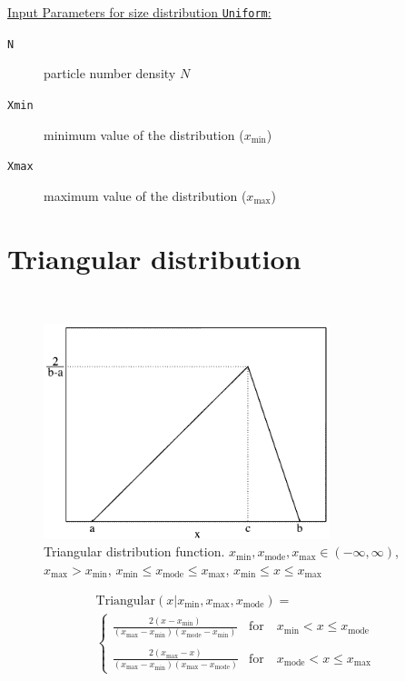 \vspace{5mm}
\uline{Input Parameters for size distribution \texttt{Uniform}:}
\begin{description}
\item[\texttt{N}] particle number density $N$
\item[\texttt{Xmin}] minimum value of the distribution ($x_\text{min}$)
\item[\texttt{Xmax}] maximum value of the distribution ($x_\text{max}$)
\end{description}


\clearpage
\section{Triangular distribution} ~\\

\begin{figure}[htb]
\begin{center}
\includegraphics[width=0.744\textwidth]{Triangular.png}
\end{center}
\caption{Triangular distribution function.
$x_\text{min},x_\text{mode},x_\text{max} \in (-\infty,\infty)$,
$x_\text{max}>x_\text{min}$,
$x_\text{min}\leq x_\text{mode}\leq x_\text{max}$,
$x_\text{min}\leq x \leq x_\text{max}$}
\label{Triangular}
\end{figure}

\begin{subequations}
\begin{multline}
\text{Triangular}(x\vert x_\text{min},x_\text{max},x_\text{mode})   =  \\
   \begin{cases}
      \displaystyle \frac{2(x-x_\text{min})}{(x_\text{max}-x_\text{min})(x_\text{mode}-x_\text{min})} & \text{for} \quad x_\text{min}<x\leq x_\text{mode} \\
      & \\
      \displaystyle \frac{2(x_\text{max}-x)}{(x_\text{max}-x_\text{min})(x_\text{max}-x_\text{mode})} & \text{for} \quad x_\text{mode}<x\leq x_\text{max}
   \end{cases}
\end{multline}
\end{subequations}

